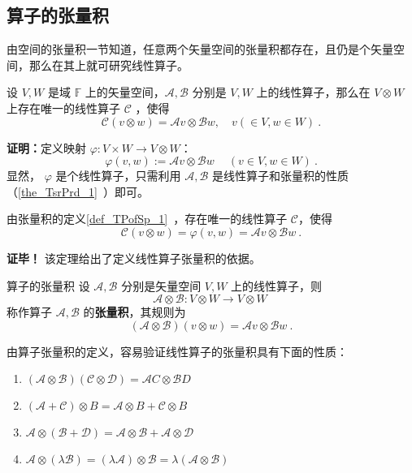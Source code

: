 

\subsection{算子的张量积}
由空间的张量积一节知道，任意两个矢量空间的张量积都存在，且仍是个矢量空间，那么在其上就可研究线性算子。
\begin{theorem}{}
设 $V,W$ 是域 $\mathbb F$ 上的矢量空间，$\mathcal A,\mathcal B$ 分别是 $V,W$ 上的线性算子，那么在 $V\otimes W$ 上存在唯一的线性算子 $\mathcal C$ ，使得
\begin{equation}\label{eq_TPofLO_1}
\mathcal C(v\otimes w)=\mathcal A v\otimes \mathcal B w,\quad v(\in V,w\in W)~.
\end{equation}
\end{theorem}
\textbf{证明：}定义映射 $\varphi:V\times W\rightarrow V\otimes W$：
\begin{equation}
\varphi(v,w):=\mathcal A v\otimes \mathcal B w~\quad (v\in V,w\in W)~.
\end{equation}
显然， $\varphi$ 是个线性算子，只需利用 $\mathcal A,\mathcal B$ 是线性算子和张量积的性质（\autoref{the_TsrPrd_1}~）即可。

由张量积的定义\autoref{def_TPofSp_1}~，存在唯一的线性算子 $\mathcal C$，使得
\begin{equation}
\mathcal C(v\otimes w)=\varphi(v,w)=\mathcal A v\otimes \mathcal B w~.
\end{equation}

\textbf{证毕！}
该定理给出了定义线性算子张量积的依据。

\begin{definition}{算子的张量积}
设 $\mathcal A,\mathcal B$ 分别是矢量空间 $V,W$ 上的线性算子，则
\begin{equation}
\mathcal A\otimes \mathcal B:V\otimes W\rightarrow V\otimes W~
\end{equation}
称作算子 $\mathcal A,\mathcal B$ 的\textbf{张量积}，其规则为
\begin{equation}
(\mathcal A\otimes \mathcal B)(v\otimes w)=\mathcal Av\otimes \mathcal Bw~.
\end{equation}
\end{definition}
由算子张量积的定义，容易验证线性算子的张量积具有下面的性质：
\begin{enumerate}
\item $(\mathcal A\otimes \mathcal B)(\mathcal C\otimes \mathcal D)=\mathcal AC\otimes \mathcal BD$
\item $(\mathcal A+\mathcal C)\otimes B=\mathcal A\otimes B+\mathcal C\otimes B$
\item $\mathcal A\otimes(\mathcal B+\mathcal D)=\mathcal A\otimes \mathcal B+\mathcal A\otimes \mathcal D$
\item $\mathcal A\otimes(\lambda\mathcal B)=(\lambda\mathcal A)\otimes \mathcal B=\lambda(\mathcal A\otimes \mathcal B)$
\end{enumerate}
